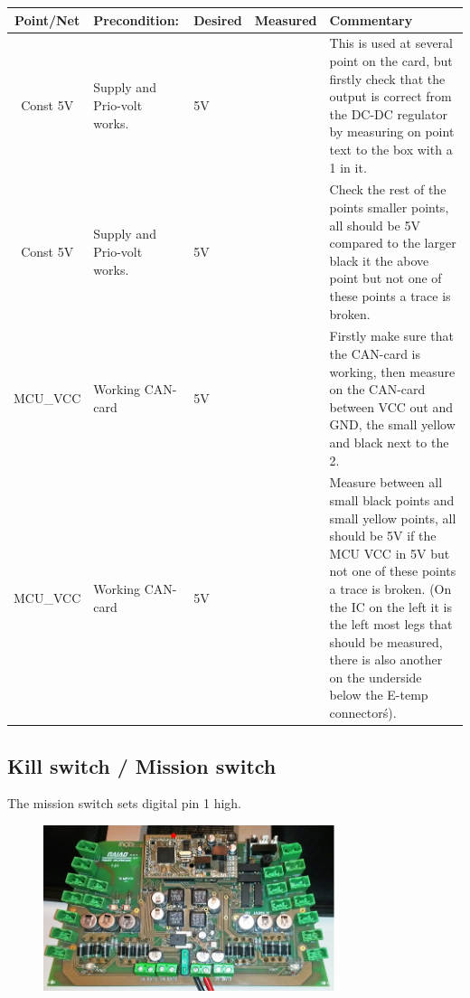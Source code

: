 \begin{table}[ht]
\begin{tabularx}{\textwidth}{|c|>{\hsize=0.6\hsize}X|>{\hsize=0.6\hsize}X|c|>{\hsize=1.8\hsize}X|} 
\hline 
Point/Net & Precondition: & Desired & Measured & Commentary \\ 
\hline 
Const 5V & Supply and Prio-volt works. & 5V &   & This is used at several point on the card, but firstly check that the output is correct from the DC-DC regulator by measuring on point text to the box with a 1 in it.  \\ 
\hline
Const 5V & Supply and Prio-volt works. & 5V &   & Check the rest of the points smaller points, all should be 5V compared to the larger black it the above point but not one of these points a trace is broken.  \\ 
\hline
MCU\_VCC & Working CAN-card & 5V &   & Firstly make sure that the CAN-card is working, then measure on the CAN-card between VCC out and GND, the small yellow and black next to the 2.  \\ 
\hline 
MCU\_VCC & Working CAN-card & 5V &   & Measure between all small black points and small yellow points, all should be 5V if the MCU VCC in 5V but not one of these points a trace is broken. (On the IC on the left it is the left most legs that should be measured, there is also another on the underside below the E-temp connector\' s).  \\ 
\hline
\end{tabularx}
\end{table}

\newpage
\subsection{Kill switch / Mission switch}
The mission switch sets digital pin 1 high.
\begin{figure}[!ht]
	\begin{center}
		\includegraphics[width=0.76\textwidth]{./Images/Unit_test_power_board/kill_mission.jpg}
		\label{motor_pwr}
	\end{center}
\end{figure}

